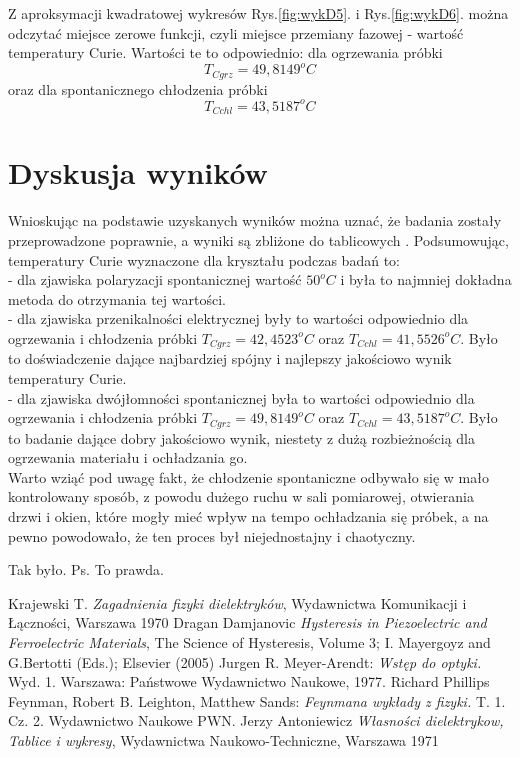 \documentclass{article}
\begin{document}
Z aproksymacji kwadratowej wykresów Rys.\ref{fig:wykD5}. i Rys.\ref{fig:wykD6}. można odczytać miejsce zerowe funkcji, czyli miejsce przemiany fazowej - wartość temperatury Curie. Wartości te to odpowiednio: dla ogrzewania próbki
\begin{equation}
T_{C grz}=49,8149^{o}C
\end{equation}
oraz dla spontanicznego chłodzenia próbki
\begin{equation}
T_{C chl}=43,5187^{o}C
\end{equation}

\section{Dyskusja wyników}
Wnioskując na podstawie uzyskanych wyników można uznać, że badania zostały przeprowadzone poprawnie, a wyniki są zbliżone do tablicowych \cite{antoniewicz}. Podsumowując, temperatury Curie wyznaczone dla kryształu podczas badań to:\\
- dla zjawiska polaryzacji spontanicznej wartość $50^{o}C$ i była to najmniej dokładna metoda do otrzymania tej wartości.\\
- dla zjawiska przenikalności elektrycznej były to wartości odpowiednio dla ogrzewania i chłodzenia próbki $T_{C grz}=42,4523^{o}C$ oraz $T_{C chl}=41,5526^{o}C$. Było to doświadczenie dające najbardziej spójny i najlepszy jakościowo wynik temperatury Curie.\\
- dla zjawiska dwójłomności spontanicznej była to wartości odpowiednio dla ogrzewania i chłodzenia próbki $T_{C grz}=49,8149^{o}C$ oraz $T_{C chl}=43,5187^{o}C$. Było to badanie dające dobry jakościowo wynik, niestety z dużą rozbieżnością dla ogrzewania materiału i ochładzania go.\\
Warto wziąć pod uwagę fakt, że chłodzenie spontaniczne odbywało się w mało kontrolowany sposób, z powodu dużego ruchu w sali pomiarowej, otwierania drzwi i okien, które mogły mieć wpływ na tempo ochładzania się próbek, a na pewno powodowało, że ten proces był niejednostajny i chaotyczny.

Tak było.
Ps. To prawda.


\begin{thebibliography}{99}
	 Krajewski T. \textit{Zagadnienia fizyki dielektryków}, Wydawnictwa Komunikacji i Łączności, Warszawa 1970 
	Dragan Damjanovic \textit{Hysteresis in Piezoelectric
and Ferroelectric Materials}, The Science of Hysteresis, Volume 3; I. Mayergoyz and G.Bertotti (Eds.); Elsevier (2005)
	 Jurgen R. Meyer-Arendt: \textit{Wstęp do optyki.} Wyd. 1. Warszawa: Państwowe Wydawnictwo Naukowe, 1977.
	 Richard Phillips Feynman, Robert B. Leighton, Matthew Sands: \textit{Feynmana wykłady z fizyki.} T. 1. Cz. 2. Wydawnictwo Naukowe PWN.
	 Jerzy Antoniewicz \textit{Własności dielektrykow, Tablice i wykresy}, Wydawnictwa Naukowo-Techniczne, Warszawa 1971
\end{thebibliography}
\end{document}
